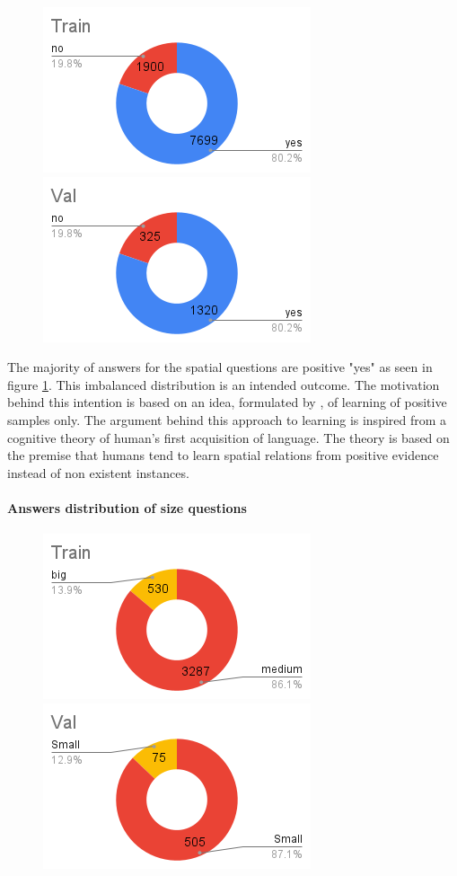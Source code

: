 \begin{figure}[H]
\includegraphics[scale=0.45]{images/TrAnSp.png}
\includegraphics[scale=0.45]{images/VlAnSp.png}
\caption{}
\label{fig:AnsDist}
\end{figure}

The majority of answers for the spatial questions are positive "yes" as seen in figure \ref{fig:AnsDist}. This imbalanced distribution is an intended outcome. The motivation behind this intention is based on an idea, formulated by \cite{regier1996human}, of learning of positive samples only. The argument behind this approach to learning  is inspired from a cognitive theory of human's first acquisition of language. The theory is  based on the premise that humans tend to learn spatial relations from positive evidence instead of non existent instances.

\paragraph{Answers distribution of size questions}

\begin{figure}[H]
\includegraphics[scale=0.45]{images/TrAnSi.png}
\includegraphics[scale=0.45]{images/VlAnSi.png}
\caption{}
\label{fig:AnsDistSI}
\end{figure}

